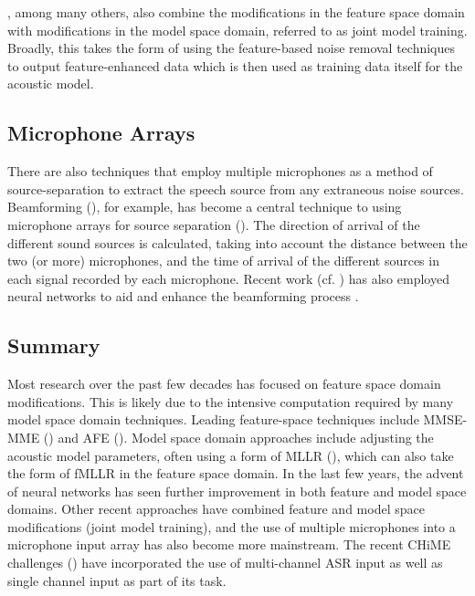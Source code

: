 \cite{weninger:13}, among many others, also combine the modifications in the feature space domain with modifications in the model space domain, referred to as joint model training.  Broadly, this takes the form of using the feature-based noise removal techniques to output feature-enhanced data which is then used as training data itself for the acoustic model.

\subsection{Microphone Arrays}

There are also techniques that employ multiple microphones as a method of source-separation to extract the speech source from any extraneous noise sources. Beamforming (\cite{veen:88}), for example, has become a central technique to using microphone arrays for source separation (\cite{hori:15,zhang:17}).
The direction of arrival of the different sound sources is calculated, taking into account the distance between the two (or more) microphones, and the time of arrival of the different sources in each signal recorded by each microphone.  Recent work (cf. \cite{heymann:15,sivasankaran:15,heymann:16}) has also employed neural networks to aid and enhance the beamforming process . 

\subsection{Summary}

Most research over the past few decades has focused on feature space domain modifications.  This is likely due to the intensive computation required by many model space domain techniques.  Leading feature-space techniques include MMSE-MME (\cite{paliwal:12}) and AFE (\cite{etsi:02}). %
Model space domain approaches include adjusting the acoustic model parameters, often using a form of MLLR (\cite{leggetter:95}), which can also take the form of fMLLR in the feature space domain.  In the last few years, the advent of neural networks has seen further improvement in both feature and model space domains.  Other recent approaches have combined feature and model space modifications (joint model training), and the use of multiple microphones into a microphone input array has also become more mainstream. The recent CHiME challenges (\cite{chime:16}) have incorporated the use of multi-channel ASR input as well as single channel input as part of its task.


